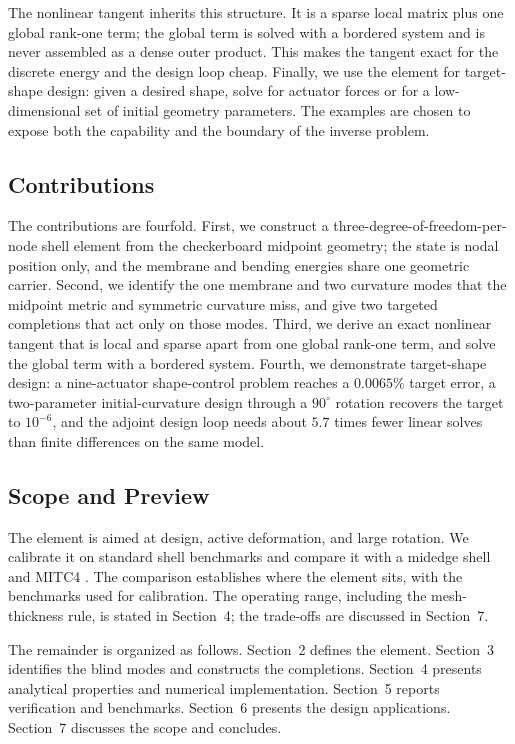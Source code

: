 The nonlinear tangent inherits this structure. It is a sparse local matrix plus
one global rank-one term; the global term is solved with a bordered system and
is never assembled as a dense outer product. This makes the tangent exact for
the discrete energy and the design loop cheap. Finally, we use the element for
target-shape design: given a desired shape, solve for actuator forces or for a
low-dimensional set of initial geometry parameters. The examples are chosen to
expose both the capability and the boundary of the inverse problem.

\subsection{Contributions}
\label{sec:intro-contributions}

The contributions are fourfold. First, we construct a
three-degree-of-freedom-per-node shell element from the checkerboard midpoint
geometry; the state is nodal position only, and the membrane and bending
energies share one geometric carrier. Second, we identify the one membrane and
two curvature modes that the midpoint metric and symmetric curvature miss, and
give two targeted completions that act only on those modes. Third, we derive an
exact nonlinear tangent that is local and sparse apart from one global rank-one
term, and solve the global term with a bordered system. Fourth, we demonstrate
target-shape design: a nine-actuator shape-control problem reaches a
$0.0065\%$ target error, a two-parameter initial-curvature design through a
$90^\circ$ rotation recovers the target to $10^{-6}$, and the adjoint design
loop needs about $5.7$ times fewer linear solves than finite differences on the
same model.

\subsection{Scope and Preview}
\label{sec:intro-scope}

The element is aimed at design, active deformation, and large rotation. We
calibrate it on standard shell benchmarks and compare it with a midedge shell
\cite{chenEtAl2026} and MITC4 \cite{dvorkinBathe1984,batheDvorkin1985}. The
comparison establishes where the element sits, with the benchmarks used for
calibration. The operating range, including the mesh-thickness rule, is stated
in Section~4; the trade-offs are discussed in Section~7.

The remainder is organized as follows. Section~2 defines the element. Section~3
identifies the blind modes and constructs the completions. Section~4 presents
analytical properties and numerical implementation. Section~5 reports
verification and benchmarks. Section~6 presents the design applications.
Section~7 discusses the scope and concludes.
